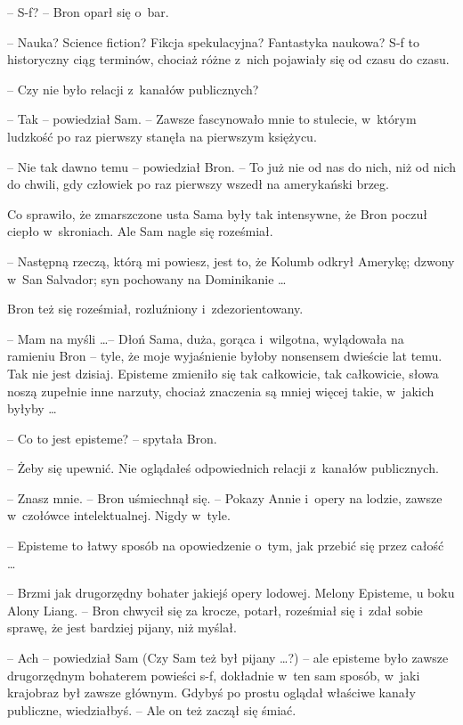 \documentclass[oneside,polish,11pt,rmheadings]{mwbk}
\begin{document}
-- S-f? -- Bron oparł się o~bar.
 
-- Nauka? Science fiction?  Fikcja spekulacyjna? Fantastyka naukowa? S-f to historyczny ciąg terminów, chociaż różne z~nich pojawiały się od czasu do czasu. 

-- Czy nie było relacji z~kanałów publicznych? 

-- Tak -- powiedział Sam.  -- Zawsze fascynowało mnie to stulecie, w~którym ludzkość po raz pierwszy stanęła na pierwszym księżycu. 

-- Nie tak dawno temu -- powiedział Bron. -- To już nie od nas do nich, niż od nich do chwili, gdy człowiek po raz pierwszy wszedł na amerykański brzeg. 

Co sprawiło, że zmarszczone usta Sama były tak intensywne, że Bron poczuł ciepło w~skroniach. Ale Sam nagle się roześmiał. 

-- Następną rzeczą, którą mi powiesz, jest to, że Kolumb odkrył Amerykę; dzwony w~San Salvador; syn pochowany na Dominikanie \ldots

Bron też się roześmiał, rozluźniony i~zdezorientowany. 

-- Mam na myśli \ldots  -- Dłoń Sama, duża, gorąca i~wilgotna, wylądowała na ramieniu Bron -- tyle, że moje wyjaśnienie byłoby nonsensem dwieście lat temu. Tak nie jest dzisiaj. Episteme zmieniło się tak całkowicie, tak całkowicie, słowa noszą zupełnie inne narzuty, chociaż znaczenia są mniej więcej takie, w~jakich byłyby \ldots  

-- Co to jest episteme? -- spytała Bron. 

-- Żeby się upewnić. Nie oglądałeś odpowiednich relacji z~kanałów publicznych. 

-- Znasz mnie. --  Bron uśmiechnął się. -- Pokazy Annie i~opery na lodzie, zawsze w~czołówce intelektualnej. Nigdy w~tyle. 

-- Episteme to łatwy sposób na opowiedzenie o~tym, jak przebić się przez całość \ldots  

-- Brzmi jak drugorzędny bohater jakiejś opery lodowej. Melony Episteme, u boku Alony Liang. -- Bron chwycił się za krocze, potarł, roześmiał się i~zdał sobie sprawę, że jest bardziej pijany, niż myślał. 

-- Ach -- powiedział Sam (Czy Sam też był pijany \ldots ?) -- ale episteme było zawsze drugorzędnym bohaterem powieści s-f, dokładnie w~ten sam sposób, w~jaki krajobraz był zawsze głównym. Gdybyś po prostu oglądał właściwe kanały publiczne, wiedziałbyś. -- Ale on też zaczął się śmiać. 
\end{document}
